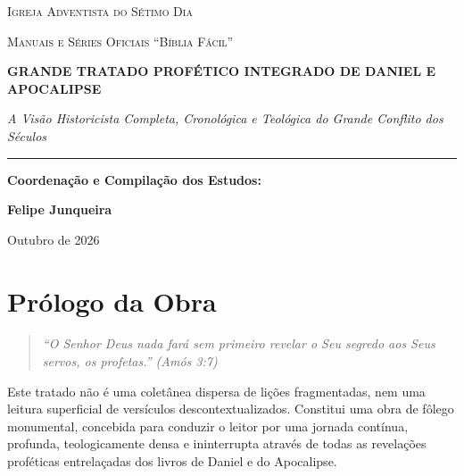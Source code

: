 \documentclass[11pt,a4paper,openany]{book}
\begin{document}
\begin{titlepage}
\centering
\vspace*{1.5cm}
{\scshape\Large Igreja Adventista do Sétimo Dia \par}
{\scshape\large Manuais e Séries Oficiais ``Bíblia Fácil'' \par}
\vspace{2.5cm}

{\Huge\bfseries\color{theoblue} GRANDE TRATADO PROFÉTICO INTEGRADO DE DANIEL E APOCALIPSE \par}
\vspace{1cm}
{\Large\itshape A Visão Historicista Completa, Cronológica e Teológica do Grande Conflito dos Séculos \par}
\vspace{1.5cm}

\rule{0.6\textwidth}{1.5pt}

\vspace{2.5cm}
{\large\bfseries Coordenação e Compilação dos Estudos:\par}
\vspace{0.3cm}
{\Large\bfseries Felipe Junqueira\par}

\vfill
{\large Outubro de 2026 \par}
\end{titlepage}

\frontmatter

\chapter*{Prólogo da Obra}

\begin{quote}
\itshape
``O Senhor Deus nada fará sem primeiro revelar o Seu segredo aos Seus servos, os profetas.'' (Amós 3:7)
\end{quote}

Este tratado não é uma coletânea dispersa de lições fragmentadas, nem uma leitura superficial de versículos descontextualizados. Constitui uma obra de fôlego monumental, concebida para conduzir o leitor por uma jornada contínua, profunda, teologicamente densa e ininterrupta através de todas as revelações proféticas entrelaçadas dos livros de Daniel e do Apocalipse.
\end{document}
